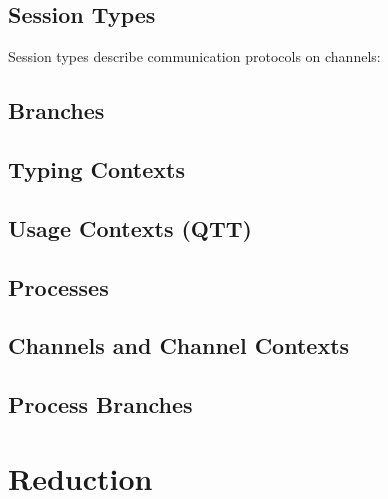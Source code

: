 \documentclass[11pt]{article}
\begin{document}

\subsection{Session Types}

Session types describe communication protocols on channels:


\subsection{Branches}


\subsection{Typing Contexts}


\subsection{Usage Contexts (QTT)}


\subsection{Processes}


\subsection{Channels and Channel Contexts}


\subsection{Process Branches}



\section{Reduction}
\end{document}
